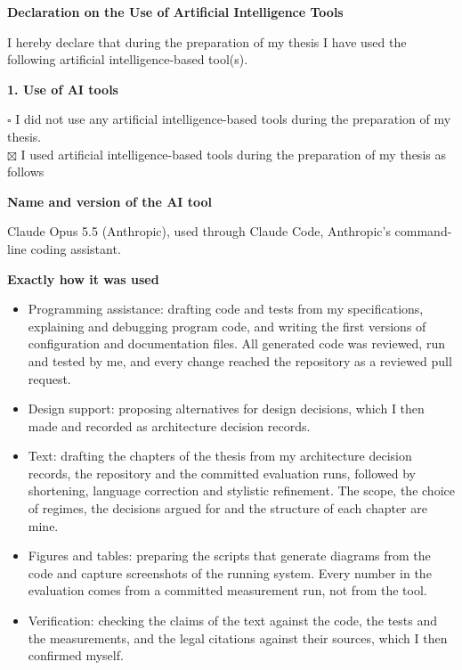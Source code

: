 \clearpage
{}
{}
\begin{center}
  {\bfseries Declaration on the Use of Artificial Intelligence Tools\par}
\end{center}
\bigskip

I hereby declare that during the preparation of my thesis I have used the following artificial intelligence-based
tool(s).

\medskip
\noindent\textbf{1. Use of AI tools}

\noindent$\square$ I did not use any artificial intelligence-based tools during the preparation of my thesis.\\
$\boxtimes$ I used artificial intelligence-based tools during the preparation of my thesis as follows

\medskip
\noindent\textbf{Name and version of the AI tool}

\noindent Claude Opus 5.5 (Anthropic), used through Claude Code, Anthropic's command-line coding assistant.

\medskip
\noindent\textbf{Exactly how it was used}

\begin{itemize}\setlength{\itemsep}{0pt}\setlength{\parskip}{0pt}
  \item Programming assistance: drafting code and tests from my specifications, explaining and debugging program
  code, and writing the first versions of configuration and documentation files. All generated code was reviewed,
  run and tested by me, and every change reached the repository as a reviewed pull request.
  \item Design support: proposing alternatives for design decisions, which I then made and recorded as
  architecture decision records.
  \item Text: drafting the chapters of the thesis from my architecture decision records, the repository and the
  committed evaluation runs, followed by shortening, language correction and stylistic refinement. The scope, the
  choice of regimes, the decisions argued for and the structure of each chapter are mine.
  \item Figures and tables: preparing the scripts that generate diagrams from the code and capture screenshots of
  the running system. Every number in the evaluation comes from a committed measurement run, not from the tool.
  \item Verification: checking the claims of the text against the code, the tests and the measurements, and the
  legal citations against their sources, which I then confirmed myself.
\end{itemize}

